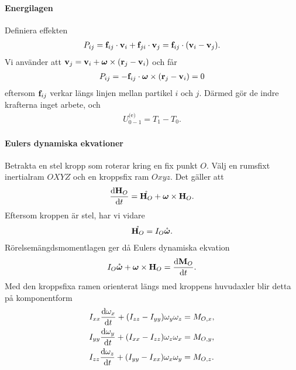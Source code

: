 \paragraph{Energilagen}
Definiera effekten
\begin{align*}
	P_{ij} = \vb{f}_{ij}\cdot\vb{v}_{i} + \vb{f}_{ji}\cdot\vb{v}_{j} = \vb{f}_{ij}\cdot(\vb{v}_{i} - \vb{v}_{j}).
\end{align*}
Vi använder att $\vb{v}_{j} = \vb{v}_{i} + \vb*{\omega}\times(\vb{r}_{j} - \vb{v}_{i})$ och får
\begin{align*}
	P_{ij} = -\vb{f}_{ij}\cdot\vb*{\omega}\times(\vb{r}_{j} - \vb{v}_{i}) = 0
\end{align*}
eftersom $\vb{f}_{ij}$ verkar längs linjen mellan partikel $i$ och $j$. Därmed gör de indre krafterna inget arbete, och
\begin{align*}
	U_{0 - 1}^{\text{(e)}} = T_{1} - T_{0}.
\end{align*}

\paragraph{Eulers dynamiska ekvationer}
Betrakta en stel kropp som roterar kring en fix punkt $O$. Välj en rumsfixt inertialram $OXYZ$ och en kroppsfix ram $Oxyz$. Det gäller att
\begin{align*}
	\dv{\vb{H}_{O}}{t} = \mathring{\vb{H}_{O}} + \vb*{\omega}\times\vb{H}_{O}.
\end{align*}
Eftersom kroppen är stel, har vi vidare
\begin{align*}
	\mathring{\vb{H}_{O}} = I_{O}\mathring{\vb*{\omega}}.
\end{align*}
Rörelsemängdsmomentlagen ger då Eulers dynamiska ekvation
\begin{align*}
	I_{O}\mathring{\vb*{\omega}} + \vb*{\omega}\times\vb{H}_{O} = \dv{\vb{M}_{O}}{t}.
\end{align*}
Med den kroppsfixa ramen orienterat längs med kroppens huvudaxler blir detta på komponentform
\begin{align*}
	I_{xx}\dv{\omega_{x}}{t} + (I_{zz} - I_{yy})\omega_{y}\omega_{z} &= M_{O, x}, \\
	I_{yy}\dv{\omega_{y}}{t} + (I_{xx} - I_{zz})\omega_{z}\omega_{x} &= M_{O, y}, \\
	I_{zz}\dv{\omega_{z}}{t} + (I_{yy} - I_{xx})\omega_{x}\omega_{y} &= M_{O, z}.
\end{align*}

